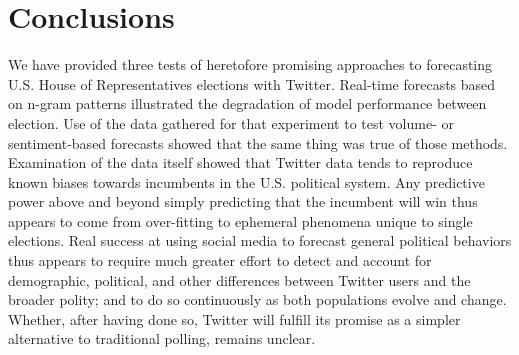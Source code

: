 \documentclass{sig-alternate-2013}
\begin{document}
\section{Conclusions}
\label{sec:conclusions}

We have provided three tests of heretofore promising approaches to
forecasting U.S. House of Representatives elections with
Twitter. Real-time forecasts based on n-gram patterns illustrated the
degradation of model performance between election. Use of the data
gathered for that experiment to test volume- or sentiment-based
forecasts showed that the same thing was true of those
methods. Examination of the data itself showed that Twitter data tends
to reproduce known biases towards incumbents in the U.S. political
system. Any predictive power above and beyond simply predicting that
the incumbent will win thus appears to come from over-fitting to
ephemeral phenomena unique to single elections. Real success at using
social media to forecast general political behaviors thus appears to
require much greater effort to detect and account for demographic,
political, and other differences between Twitter users and the broader
polity; and to do so continuously as both populations evolve and
change. Whether, after having done so, Twitter will fulfill its
promise as a simpler alternative to traditional polling, remains unclear.




\end{document}
